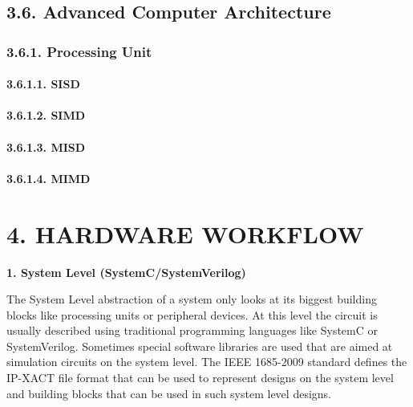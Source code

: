 \documentclass[
]{article}
\begin{document}
\hypertarget{advanced-computer-architecture}{%
\subsection{3.6. Advanced Computer
Architecture}\label{advanced-computer-architecture}}

\hypertarget{processing-unit}{%
\subsubsection{3.6.1. Processing Unit}\label{processing-unit}}

\hypertarget{sisd}{%
\paragraph{3.6.1.1. SISD}\label{sisd}}

\hypertarget{simd}{%
\paragraph{3.6.1.2. SIMD}\label{simd}}

\hypertarget{misd}{%
\paragraph{3.6.1.3. MISD}\label{misd}}

\hypertarget{mimd}{%
\paragraph{3.6.1.4. MIMD}\label{mimd}}

\hypertarget{hardware-workflow}{%
\section{4. HARDWARE WORKFLOW}\label{hardware-workflow}}

\textbf{1. System Level (SystemC/SystemVerilog)}

The System Level abstraction of a system only looks at its biggest
building blocks like processing units or peripheral devices. At this
level the circuit is usually described using traditional programming
languages like SystemC or SystemVerilog. Sometimes special software
libraries are used that are aimed at simulation circuits on the system
level. The IEEE 1685-2009 standard defines the IP-XACT file format that
can be used to represent designs on the system level and building blocks
that can be used in such system level designs.
\end{document}
